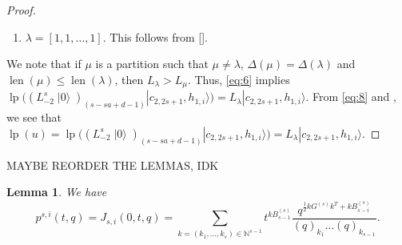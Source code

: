 \documentclass[a4paper, 12pt, reqno]{amsart}
\newtheorem{lemma}[theorem]{Lemma}
\theoremstyle{remark}
\DeclareMathOperator{\len}{len}
\DeclareMathOperator{\vac}{|0\rangle}
\DeclareMathOperator{\lp}{lp}
\begin{document}
\begin{proof}
\begin{enumerate}
\begin{description}[leftmargin = !]
      Since $\binom{s - 1}{d - 1} + \binom{s - 1}{d} = \binom{s}{d}$, we obtain \eqref{eq:6}.
    \end{description}
  \item $\lambda = [1, 1, \dots, 1]$.
    This follows from [].
  \end{enumerate}
  We note that if $\mu$ is a partition such that $\mu \neq \lambda$, $\Delta(\mu) = \Delta(\lambda)$ and $\len(\mu) \le \len(\lambda)$, then $L_{\lambda} > L_{\mu}$.
  Thus, \eqref{eq:6} implies $\lp((L_{-2}^s\vac)_{(s - sa + d - 1)}|c_{2, 2s + 1}, h_{1, i}\rangle) = L_{\lambda}|c_{2, 2s + 1}, h_{1, i}\rangle$.
  From \eqref{eq:8} and , we see that $\lp(u) = \lp((L_{-2}^s\vac)_{(s - sa + d - 1)}|c_{2, 2s + 1}, h_{1, i}\rangle) = L_{\lambda}|c_{2, 2s + 1}, h_{1, i}\rangle$.
\end{proof}

MAYBE REORDER THE LEMMAS, IDK

\begin{lemma}
  \label{lmm:5}
  We have
  \begin{equation*}
    p^{s, i}(t, q) = J_{s, i}(0, t, q) = \sum_{k = (k_1, \dots, k_s) \in \mathbb{N}^{s - 1}}t^{kB^{(s)}_{s - 1}}\frac{q^{\frac{1}{2}kG^{(s)}k^T + kB^{(s)}_{s - i}}}{(q)_{k_1}\dots(q)_{k_{s - 1}}}.
  \end{equation*}
\end{lemma}
\end{document}
